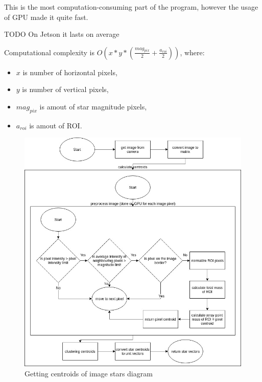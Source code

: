 \documentclass[12pt,a4paper,oneside]{article}
\begin{document}
This is the most computation-consuming part of the program, however the usage of GPU made it quite fast.

TODO On Jetson it lasts on average 

Computational complexity is $O(x*y*(\frac{mag_{pix}}{2}+\frac{a_{roi}}{2}))$, where:
\begin{itemize}[noitemsep]
\item $x$ is number of horizontal pixels,
\item $y$ is number of vertical pixels,
\item $mag_{pix}$ is amout of star magnitude pixels,
\item $a_{roi}$ is amout of ROI.
\end{itemize}

\begin{figure}[!htbp]
\includegraphics[scale=0.51]{get_image_stars_diagram.jpg}
\centering
\caption{Getting centroids of image stars diagram}
\label{fig:startracker_diagram}
\end{figure}
\end{document}
